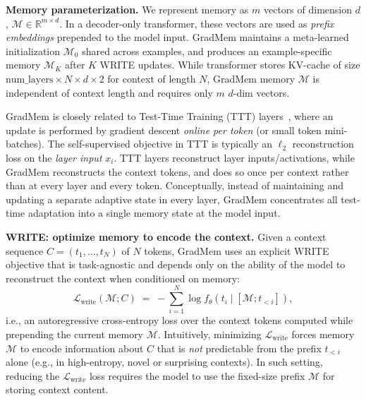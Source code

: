 \documentclass{article}
\theoremstyle{plain}
\theoremstyle{definition}
\theoremstyle{remark}
\begin{document}
\textbf{Memory parameterization.}
We represent memory as $m$ vectors of dimension $d$, $\mathcal{M} \in \mathbb{R}^{m \times d}$. In a decoder-only transformer, these vectors are used as \emph{prefix embeddings} prepended to the model input. GradMem maintains a meta-learned initialization $\mathcal{M}_0$ shared across examples, and produces an example-specific memory $\mathcal{M}_K$ after $K$ WRITE updates. While transformer stores KV-cache of size $\text{num\_layers} \times N\times d \times 2$ for context of length $N$, GradMem memory $\mathcal{M}$ is independent of context length and requires only $m$ $d$-dim vectors.

GradMem is closely related to Test-Time Training (TTT) layers~\citep{sun2025l2l}, where an update is performed by gradient descent \emph{online per token} (or small token mini-batches).
The self-supervised objective in TTT is typically an $\ell_2$ reconstruction loss on the \emph{layer input} $x_i$.
TTT layers reconstruct layer inputs/activations, while GradMem reconstructs the context tokens, and does so once per context rather than at every layer and every token.
Conceptually, instead of maintaining and updating a separate adaptive state in every layer, GradMem concentrates all test-time adaptation into a single memory state at the model input.

\textbf{WRITE: optimize memory to encode the context.}
Given a context sequence $C=(t_1,\dots,t_N)$ of $N$ tokens, GradMem uses an explicit WRITE objective that is task-agnostic and depends only on the ability of the model to reconstruct the context when conditioned on memory:
\begin{equation}
\mathcal{L}_{\text{write}}(\mathcal{M}; C)
\;=\;
-\sum_{i=1}^{N} \log f_\theta\!\left(t_i \mid [\mathcal{M}; t_{<i}] \right),
\label{eq:write_loss}
\end{equation}
i.e., an autoregressive cross-entropy loss over the context tokens computed while prepending the current memory $\mathcal{M}$.
Intuitively, minimizing $\mathcal{L}_{\text{write}}$ forces memory $\mathcal{M}$ to encode information about $C$ that is \emph{not} predictable from the prefix $t_{<i}$ alone (e.g., in high-entropy, novel or surprising contexts). In such setting, reducing the $\mathcal{L}_{\text{write}}$ loss requires the model to use the fixed-size prefix $\mathcal{M}$ for storing context content.
\end{document}
